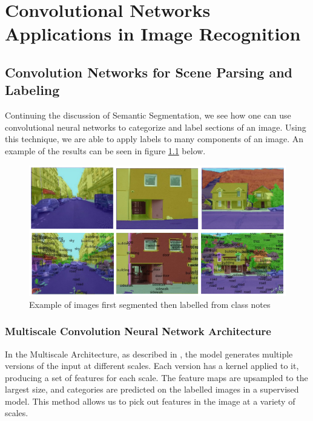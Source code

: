\chapter{Convolutional Networks Applications in Image Recognition}

\section{Convolution Networks for Scene Parsing and Labeling} \label{section:sceneParsing}
Continuing the discussion of Semantic Segmentation, we see how one can use convolutional neural networks to categorize and label sections of an image.  
Using this technique, we are able to apply labels to many components of an image.  An example of the results can be seen in figure \ref{fig:sceneParsing} below.

\begin{figure}[!ht]
  \includegraphics[width=\textwidth]{figs/SceneParsing.png}
  \caption{Example of images first segmented then labelled from class notes}
  \label{fig:sceneParsing}
\end{figure}

\subsection{Multiscale Convolution Neural Network Architecture} \label{subsection:s_multiscale}
In the Multiscale Architecture, as described in \cite{Farabet:2013:LHF:2498740.2498895}, the model generates multiple versions of the input at different scales.  
Each version has a kernel applied to it, producing a set of features for each scale.  
The feature maps are upsampled to the largest size, and categories are predicted on the labelled images in a supervised model.  
This method allows us to pick out features in the image at a variety of scales.

